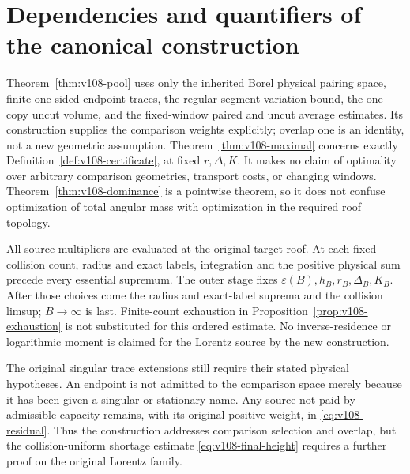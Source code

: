 \section{Dependencies and quantifiers of the canonical construction}
\label{app:v108-audit}
Theorem~\ref{thm:v108-pool} uses only the inherited Borel physical
pairing space, finite one-sided endpoint traces, the regular-segment
variation bound, the one-copy uncut volume, and the fixed-window
paired and uncut average estimates. Its construction supplies the
comparison weights explicitly; overlap one is an identity, not a
new geometric assumption. Theorem~\ref{thm:v108-maximal} concerns
exactly Definition~\ref{def:v108-certificate}, at fixed $r,\Delta,K$.
It makes no claim of optimality over arbitrary comparison geometries,
transport costs, or changing windows. Theorem~\ref{thm:v108-dominance}
is a pointwise theorem, so it does not confuse optimization of total
angular mass with optimization in the required roof topology.

All source multipliers are evaluated at the original target roof.
At each fixed collision count, radius and exact labels, integration
and the positive physical sum precede every essential supremum.
The outer stage fixes $\varepsilon(B),h_B,r_B,\Delta_B,K_B$.
After those choices come the radius and exact-label suprema and the
collision limsup; $B\to\infty$ is last. Finite-count exhaustion in
Proposition~\ref{prop:v108-exhaustion} is not substituted for this
ordered estimate. No inverse-residence or logarithmic moment is
claimed for the Lorentz source by the new construction.

The original singular trace extensions still require their stated
physical hypotheses. An endpoint is not admitted to the comparison
space merely because it has been given a singular or stationary
name. Any source not paid by admissible capacity remains, with its
original positive weight, in \eqref{eq:v108-residual}. Thus the
construction addresses comparison selection and overlap, but the
collision-uniform shortage estimate \eqref{eq:v108-final-height}
requires a further proof on the original Lorentz family.

